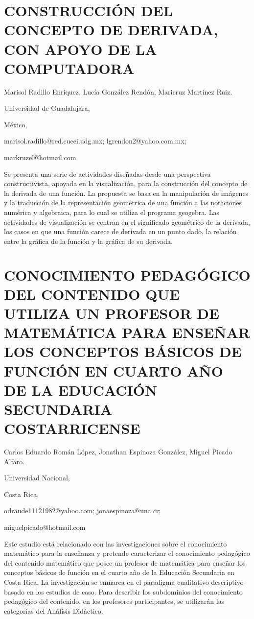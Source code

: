 \section{CONSTRUCCIÓN DEL CONCEPTO DE DERIVADA, CON APOYO DE LA COMPUTADORA }

\begin{datos}

Marisol Radillo Enríquez, Lucía González Rendón, Maricruz Martínez
Ruiz.

Universidad de Guadalajara,

México,

marisol.radillo@red.cucei.udg.mx; lgrendon2@yahoo.com.mx;

markruzel@hotmail.com

\end{datos}

Se presenta una serie de actividades diseñadas desde una perspectiva
constructivista, apoyada en la visualización, para la construcción
del concepto de la derivada de una función. La propuesta se basa en
la manipulación de imágenes y la traducción de la representación geométrica
de una función a las notaciones numérica y algebraica, para lo cual
se utiliza el programa geogebra. Las actividades de visualización
se centran en el significado geométrico de la derivada, los casos
en que una función carece de derivada en un punto dado, la relación
entre la gráfica de la función y la gráfica de su derivada. 


\section{CONOCIMIENTO PEDAGÓGICO DEL CONTENIDO QUE UTILIZA UN PROFESOR DE
MATEMÁTICA PARA ENSEÑAR LOS CONCEPTOS BÁSICOS DE FUNCIÓN EN CUARTO
AÑO DE LA EDUCACIÓN SECUNDARIA COSTARRICENSE}

\begin{datos}

Carlos Eduardo Román López, Jonathan Espinoza González, Miguel Picado
Alfaro.

Universidad Nacional,

Costa Rica,

odraude11121982@yahoo.com; jonaespinoza@una.cr;

miguelpicado@hotmail.com

\end{datos}

Este estudio está relacionado con las investigaciones sobre el conocimiento
matemático para la enseñanza y pretende caracterizar el conocimiento
pedagógico del contenido matemático que posee un profesor de matemática
para enseñar los conceptos básicos de función en el cuarto año de
la Educación Secundaria en Costa Rica. La investigación se enmarca
en el paradigma cualitativo descriptivo basado en los estudios de
caso. Para describir los subdominios del conocimiento pedagógico del
contenido, en los profesores participantes, se utilizarán las categorías
del Análisis Didáctico.


